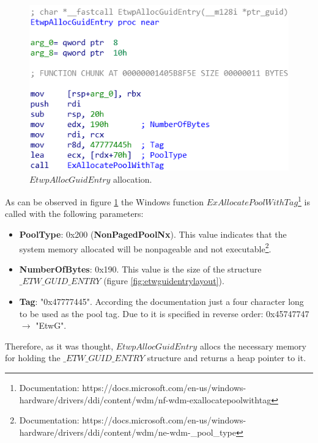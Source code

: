   \begin{centering}
    \begin{figure}[H]
      \includegraphics[width=12cm]{images/etwpallocguidentry.png}
      \caption[]{$EtwpAllocGuidEntry$ allocation.}
      \label{fig:etwallocguidentry}
    \end{figure}
  \end{centering}

As can be observed in figure \ref{fig:etwallocguidentry} the Windows function $ExAllocatePoolWithTag$\footnote{Documentation: https://docs.microsoft.com/en-us/windows-hardware/drivers/ddi/content/wdm/nf-wdm-exallocatepoolwithtag} is called with the following parameters:
\begin{itemize}
  \setlength\itemsep{0.05em}
  \item {\bfseries PoolType}: 0x200 ({\bfseries NonPagedPoolNx}). This value indicates that the system memory allocated will be nonpageable and not executable\footnote{Documentation: https://docs.microsoft.com/en-us/windows-hardware/drivers/ddi/content/wdm/ne-wdm-\_pool\_type}.
  \item {\bfseries NumberOfBytes}: 0x190. This value is the size of the structure $\_ETW\_GUID\_ENTRY$ (figure \ref{fig:etwguidentrylayout}).
  \item {\bfseries Tag}: "0x47777445". According the documentation just a four character long to be used as the pool tag. Due to it is specified in reverse order: 0x45747747 $\rightarrow$ "EtwG".
\end{itemize}

Therefore, as it was thought, $EtwpAllocGuidEntry$ allocs the necessary memory for holding the $\_ETW\_GUID\_ENTRY$ structure and returns a heap pointer to it. \\


